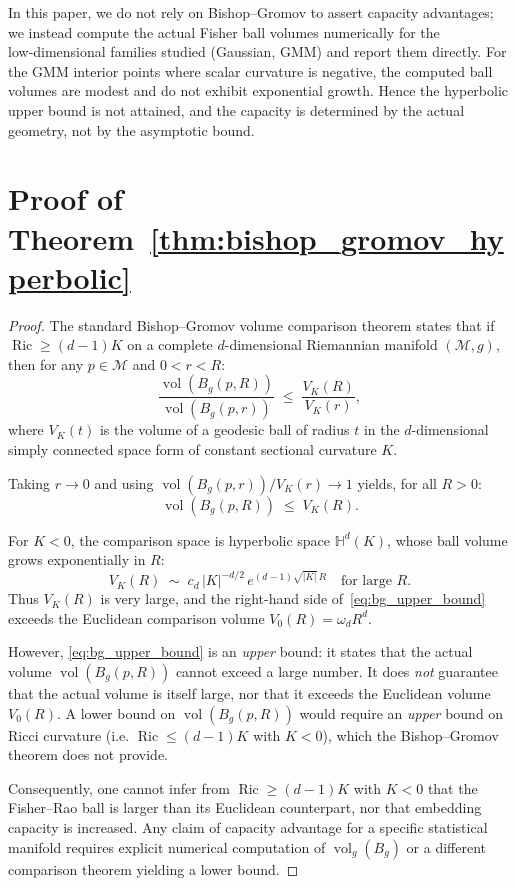 \documentclass[a4paper,fleqn]{cas-dc}
\begin{document}
In this paper, we do not rely on Bishop–Gromov to assert capacity
advantages; we instead compute the actual Fisher ball volumes
numerically for the low‑dimensional families studied (Gaussian, GMM)
and report them directly.  For the GMM interior points where scalar
curvature is negative, the computed ball volumes are modest and do not
exhibit exponential growth.  Hence the hyperbolic upper bound is not
attained, and the capacity is determined by the actual geometry, not by
the asymptotic bound.

\section{Proof of Theorem~\ref{thm:bishop_gromov_hyperbolic}}
\label{app:proof_bishop_gromov}

\begin{proof}
The standard Bishop--Gromov volume comparison theorem 
\cite[Thm.~III.4.2]{chavel2006riemannian} states that if 
$\operatorname{Ric} \geq (d-1)K$ on a complete $d$-dimensional Riemannian 
manifold $(\mathcal{M},g)$, then for any $p\in\mathcal{M}$ and 
$0 < r < R$:
\[
\frac{\operatorname{vol}(B_{g}(p,R))}{\operatorname{vol}(B_{g}(p,r))}
\;\leq\;
\frac{V_{K}(R)}{V_{K}(r)},
\]
where $V_{K}(t)$ is the volume of a geodesic ball of radius $t$ in the 
$d$-dimensional simply connected space form of constant sectional 
curvature $K$.

Taking $r\to 0$ and using 
$\operatorname{vol}(B_{g}(p,r))/V_{K}(r) \to 1$ yields, for all $R>0$:
\begin{equation}
\operatorname{vol}(B_{g}(p,R)) \;\leq\; V_{K}(R).
\label{eq:bg_upper_bound}
\end{equation}

For $K<0$, the comparison space is hyperbolic space 
$\mathbb{H}^{d}(K)$, whose ball volume grows exponentially in $R$:
\[
V_{K}(R) \;\sim\; c_{d}\,|K|^{-d/2}\,e^{(d-1)\sqrt{|K|}\,R}
\quad\text{for large }R.
\]
Thus $V_{K}(R)$ is very large, and the right-hand side 
of~\eqref{eq:bg_upper_bound} exceeds the Euclidean comparison volume 
$V_{0}(R)=\omega_{d}R^{d}$.

However, \eqref{eq:bg_upper_bound} is an \emph{upper} bound: it states 
that the actual volume $\operatorname{vol}(B_{g}(p,R))$ cannot exceed a 
large number.  It does \emph{not} guarantee that the actual volume is 
itself large, nor that it exceeds the Euclidean volume $V_{0}(R)$.  
A lower bound on $\operatorname{vol}(B_{g}(p,R))$ would require an 
\emph{upper} bound on Ricci curvature (i.e. 
$\operatorname{Ric} \leq (d-1)K$ with $K<0$), which the 
Bishop--Gromov theorem does not provide.

Consequently, one cannot infer from $\operatorname{Ric} \geq (d-1)K$ 
with $K<0$ that the Fisher--Rao ball is larger than its Euclidean 
counterpart, nor that embedding capacity is increased.  Any claim of 
capacity advantage for a specific statistical manifold requires explicit 
numerical computation of $\operatorname{vol}_{g}(B_{g})$ or a different 
comparison theorem yielding a lower bound.
\end{proof}
\end{document}
